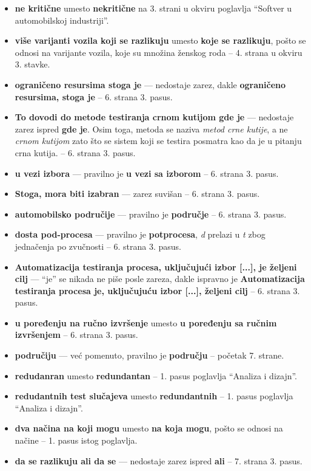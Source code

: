 \documentclass[a4paper]{report}
\begin{document}
\begin{itemize}
\item{\bf ne kritične} umesto {\bf{nekritične}} na 3. strani u okviru poglavlja ``Softver u automobilskoj industriji''.
\item {\bf{više varijanti vozila koji se razlikuju}} umesto {\bf{koje se razlikuju}}, pošto se odnosi na varijante vozila, koje su množina ženskog roda -- 4. strana u okviru 3. stavke.
\item {\bf{ograničeno resursima stoga je}} --- nedostaje zarez, dakle {\bf{ograničeno resursima, stoga je}} -- 6. strana 3. pasus.
\item {\bf{To dovodi do metode testiranja crnom kutijom gde je}} --- nedostaje zarez ispred {\bf{gde je}}. Osim toga, metoda se naziva {\em{metod crne kutije}}, a ne {\em{crnom kutijom}} zato što se sistem koji se testira posmatra kao da je u pitanju crna kutija. -- 6. strana 3. pasus.
\item {\bf{u vezi izbora}} --- pravilno je {\bf{u vezi sa izborom}} -- 6. strana 3. pasus.
\item {\bf{Stoga, mora biti izabran}} --- zarez suvišan -- 6. strana 3. pasus.
\item {\bf{automobilsko područije}} --- pravilno je {\bf{područje}} -- 6. strana 3. pasus.
\item {\bf{dosta pod-procesa}} --- pravilno je {\bf{potprocesa}}, {\em{d}} prelazi u {\em{t}} zbog jednačenja po zvučnosti -- 6. strana 3. pasus.
\item {\bf{Automatizacija testiranja procesa, uključujući izbor [...], je željeni cilj}} --- ``je'' se nikada ne piše posle zareza, dakle ispravno je {\bf{Automatizacija testiranja procesa je, uključujuću izbor [...], željeni cilj}} -- 6. strana 3. pasus.
\item {\bf{u poređenju na ručno izvršenje}} umesto {\bf{u poređenju sa ručnim izvršenjem}} -- 6. strana 3. pasus.
\item {\bf{područiju}} --- već pomenuto, pravilno je {\bf{području}} -- početak 7. strane.
\item {\bf{redudanran}} umesto {\bf{redundantan}} -- 1. pasus poglavlja ``Analiza i dizajn''.
\item {\bf{redudantnih test slučajeva}} umesto {\bf{redundantnih}} -- 1. pasus poglavlja ``Analiza i dizajn''.
\item {\bf{dva načina na koji mogu}} umesto {\bf{na koja mogu}}, pošto se odnosi na načine -- 1. pasus istog poglavlja.
\item {\bf{da se razlikuju ali da se}} --- nedostaje zarez ispred {\bf{ali}} -- 7. strana 3. pasus.

\end{itemize}
\end{document}
